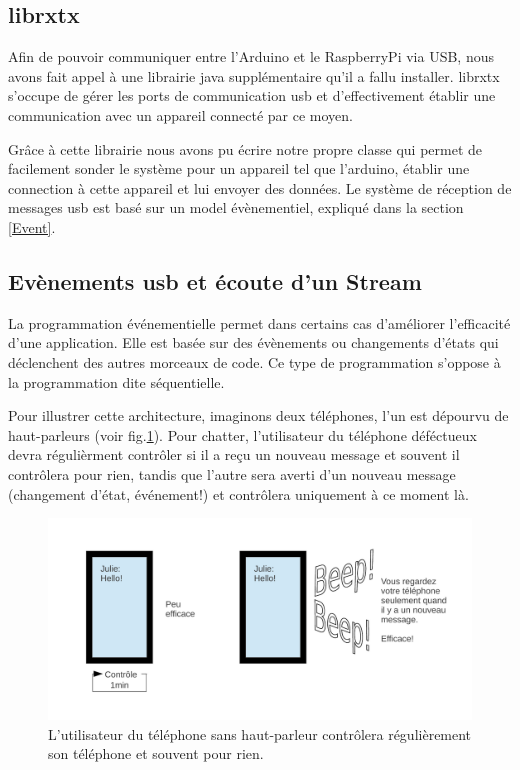 \documentclass[a4paper,11pt]{report}
\begin{document}
{\subsection{librxtx}

Afin de pouvoir communiquer entre l'Arduino et le RaspberryPi via USB, nous avons fait appel à une librairie java supplémentaire qu'il a fallu installer. librxtx s'occupe de gérer les ports de communication usb et d'effectivement établir une communication avec un appareil connecté par ce moyen.

Grâce à cette librairie nous avons pu écrire notre propre classe qui permet de facilement sonder le système pour un appareil tel que l'arduino, établir une connection à cette appareil et lui envoyer des données. Le système de réception de messages usb est basé sur un model évènementiel, expliqué dans la section \ref{Event}.

\subsection{Evènements usb et écoute d'un Stream\label{Event}}

La programmation événementielle permet dans certains cas d'améliorer l'efficacité d'une application. Elle est basée sur des évènements ou changements d'états qui déclenchent des autres morceaux de code. Ce type de programmation s'oppose à la programmation dite séquentielle.

Pour illustrer cette architecture, imaginons deux téléphones, l'un est dépourvu de haut-parleurs (voir fig.\ref{ChatExample}). Pour chatter, l'utilisateur du téléphone déféctueux devra régulièrment contrôler si il a reçu un nouveau message et souvent il contrôlera pour rien, tandis que l'autre sera averti d'un nouveau message (changement d'état, événement!) et contrôlera uniquement à ce moment là.  

\begin{figure}[h]
\includegraphics[width=1.0\textwidth]{figures/EventProgramming1.pdf}
\caption[Analogie à la programmation événementielle]{\label{ChatExample}L'utilisateur du téléphone sans haut-parleur contrôlera régulièrement son téléphone et souvent pour rien.}
\end{figure}

}
\end{document}
